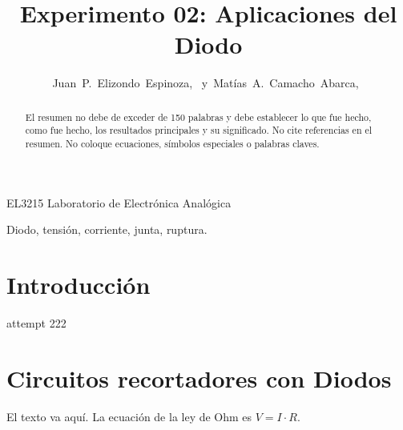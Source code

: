 \documentclass[journal]{IEEEtran}
\begin{document}
%
\title{Experimento 02: Aplicaciones del Diodo}


\author{Juan~P.~Elizondo~Espinoza,~
        y~Matías~A.~Camacho~Abarca,~
}


%
{EL3215 Laboratorio de Electrónica Analógica}


\maketitle


\begin{abstract}
El resumen no debe de exceder de 150 palabras y debe establecer lo que fue hecho, como fue hecho, los resultados principales y su significado. No cite referencias en el resumen. No coloque ecuaciones, símbolos especiales o palabras claves.
\end{abstract}

\begin{IEEEkeywords}
Diodo, tensión, corriente, junta, ruptura.
\end{IEEEkeywords}


\section{Introducción}

 attempt 222

\section{Circuitos recortadores con Diodos}
El texto va aquí. La ecuación de la ley de Ohm es $V=I\cdot R$.
\end{document}

